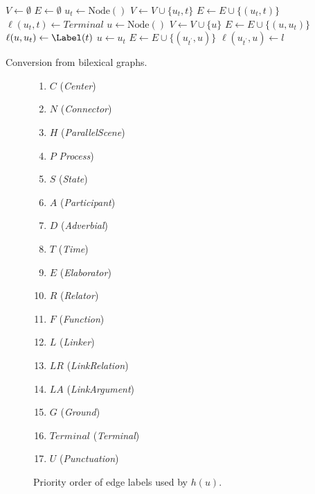 \documentclass[11pt,a4paper]{article}
\begin{document}
\begin{algorithm}[ht]
 $V \leftarrow \emptyset$\;
 $E \leftarrow \emptyset$\;
  {
  $u_t \leftarrow \mathrm{Node()}$\;
  $V \leftarrow V \cup \{u_t, t\}$\;
  $E \leftarrow E \cup \{(u_t, t)\}$\;
  $\ell(u_t,t)\leftarrow\mathit{Terminal}$\;
   {
    {
     {
     $u \leftarrow \mathrm{Node()}$\;
     $V \leftarrow V \cup \{u\}$\;
     $E \leftarrow E \cup \{(u, u_t)\}$\;
     $\ell(u, u_t) \leftarrow \Label(t)$\;
    } {
     $u \leftarrow u_t$\;
    }
    $E \leftarrow E \cup \{(u_{t^\prime}, u)\}$\;
    $\ell(u_{t^\prime}, u) \leftarrow l$\;
    }
  }
 }
 
  
 \caption{Conversion from bilexical graphs.}
 \label{alg:from_bilexical}
\end{algorithm}

\begin{figure}[ht]
\begin{enumerate}
\itemsep0em
\item $C$ (\textit{Center})
\item $N$ (\textit{Connector})
\item $H$ (\textit{ParallelScene})
\item $P$ \textit{Process})
\item $S$ (\textit{State})
\item $A$ (\textit{Participant})
\item $D$ (\textit{Adverbial})
\item $T$ (\textit{Time})
\item $E$ (\textit{Elaborator})
\item $R$ (\textit{Relator})
\item $F$ (\textit{Function})
\item $L$ (\textit{Linker})
\item $LR$ (\textit{LinkRelation})
\item $LA$ (\textit{LinkArgument})
\item $G$ (\textit{Ground})
\item $\mathit{Terminal}$ (\textit{Terminal})
\item $U$ (\textit{Punctuation})
\end{enumerate}
\caption{Priority order of edge labels used by $h(u)$.}
\label{fig:priority}
\end{figure}
\end{document}
